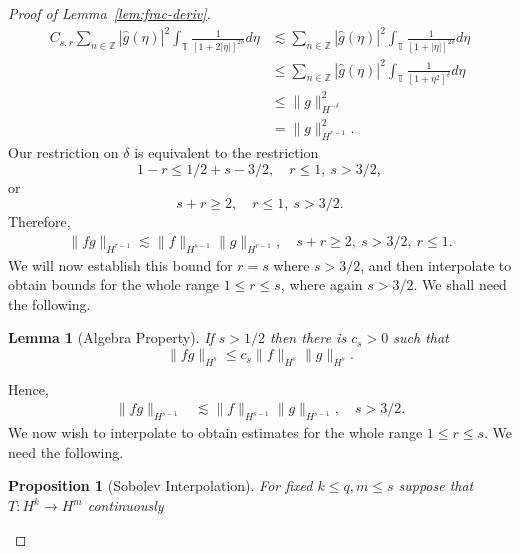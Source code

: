 \documentclass[12pt,reqno]{amsart}
\numberwithin{equation}{section}  %
\numberwithin{figure}{section}
\newcommand{\zz}{\mathbb{Z}}
\newcommand{\ci}{\mathbb{T}}
\newcommand{\wh}{\widehat}
\newtheorem{lemma}[theorem]{Lemma}
\newtheorem{proposition}[theorem]{Proposition}
\begin{document}
\begin{proof}[Proof of Lemma~\ref{lem:frac-deriv}]
\begin{equation*}
\begin{split}
  C_{s,r} \sum_{n \in \zz}  | \wh{g}(\eta) |^{2} \int_{\ci} \frac{1}{\left[ 1
  + 2 |\eta| \right]^{2 \delta}}  d \eta 
  & \lesssim
  \sum_{n \in \zz}  | \wh{g}(\eta) |^{2} \int_{\ci} \frac{1}{\left[ 1
  + |\eta| \right]^{2 \delta}}  d \eta  
  \\
  & \le \sum_{n \in \zz}  | \wh{g}(\eta) |^{2} \int_{\ci} \frac{1}{\left[ 1
  + \eta^{2} \right]^{\delta}}  d \eta  
  \\
  & \le \| g \|_{H^{-\delta}}^{2}
  \\
  & = \| g \|_{H^{r-1}}^{2}.
\end{split}
\end{equation*}
%
Our restriction on $\delta$ is equivalent to the restriction 
$$1-r \le 1/2 + s - 3/2, \quad r \le 1, \ s > 3/2,$$ or
$$s + r \ge 2,  \quad  r \le 1, \ s > 3/2.$$ Therefore, 
%
%
%
%
\begin{equation}
  \label{yhh}
\begin{split}
  \| f g \|_{H^{r-1}} \lesssim \| f \|_{H^{s-1}} \| g \|_{H^{r-1}},
  \quad s + r \ge 2, \ s > 3/2, \ r \le 1.
\end{split}
\end{equation}
We will now establish this bound for $r=s$ where $s > 3/2$, and then interpolate to obtain
bounds for the whole range $1 \le r \le s$, where again $s > 3/2$. We shall need the following. 
%
%
\begin{lemma}[Algebra Property]
  \label{lem:alg-prop}
If  $s>1/2$ then there is $c_s>0$ such that 
%
%
%
\begin{equation} \label{KP-com-est}
  \| fg\|_{H^{s}} \le c_s \| f \|_{H^{s}} \| g \|_{H^{s}}.
\end{equation}
%
%
%
\end{lemma}
%
%
%
%
%
Hence,
%
%
\begin{equation}
  \label{pre-interp-1}
\begin{split}
  \| f g \|_{H^{s-1}}
  & \lesssim   \|f  \|_{H^{s-1}} \| g \|_{H^{s-1}}, \quad s >3/2.
\end{split}
\end{equation}
%
%
%
%
%
%
%
We now wish to interpolate to obtain estimates for the whole range $1 \le r \le s$.
We need the following.
%
%
%
%
%                
%
%
%
%
\begin{proposition}[Sobolev Interpolation]
  For fixed $k \le q, m \le s$ suppose that \\ $T: H^{k} \to H^{m}$ continuously

\end{proposition}
\end{proof}
\end{document}
